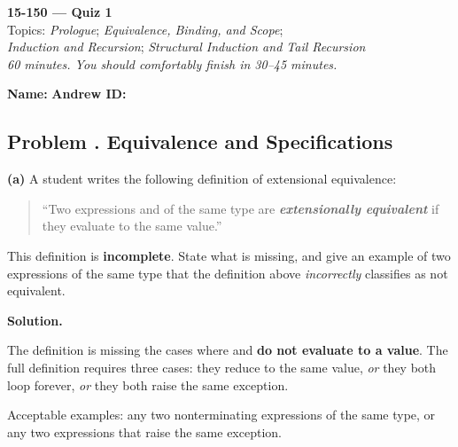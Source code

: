 \documentclass[crop=false]{standalone}
\newif\ifsol
\newenvironment{solution}
    {\par\color{solution_color}\begin{framed}\textbf{Solution.}\par}
    {\end{framed}}
\newcommand{\term}[1]{\textbf{\textit{#1}}}
\newcommand{\quizproblem}[2]{%
  \needspace{5\baselineskip}%
  \stepcounter{problem}%
  \ifsol
    \subsection*{Problem \arabic{problem}. #1 \hfill \timing{#2}}%
  \else
    \subsection*{Problem \arabic{problem}. #1}%
  \fi
}
\newcommand{\answerspace}[1]{\ifsol\else\vspace{#1}\par\fi}
\begin{document}
\begin{center}
  {\Large \textbf{15-150 --- Quiz 1}} \\
  \vspace{4pt}
  Topics: \textit{Prologue}; \textit{Equivalence, Binding, and Scope}; \\
  \textit{Induction and Recursion}; \textit{Structural Induction and Tail Recursion} \\
  \vspace{4pt}
  \textit{60 minutes. You should comfortably finish in 30--45 minutes.}
\end{center}

\vspace{1em}

\noindent\textbf{Name:} \hrulefill \hspace{2em} \textbf{Andrew ID:} \hrulefill

\vspace{1em}


\quizproblem{Equivalence and Specifications}{10}

\textbf{(a)} A student writes the following definition of extensional
equivalence:

\begin{quote}
``Two expressions  and  of the same type are
\term{extensionally equivalent} if they evaluate to the same value.''
\end{quote}

This definition is \textbf{incomplete}. State what is missing, and give an
example of two expressions of the same type that the definition above
\emph{incorrectly} classifies as not equivalent.

\answerspace{4cm}

\begin{solution}
The definition is missing the cases where  and 
\textbf{do not evaluate to a value}. The full definition requires three
cases: they reduce to the same value, \emph{or} they both loop forever,
\emph{or} they both raise the same exception.

Acceptable examples: any two nonterminating expressions of the same
type, or any two expressions that raise the same exception.
\end{solution}
\end{document}
